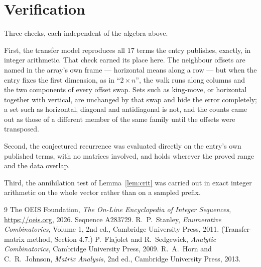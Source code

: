 \documentclass[11pt,a4paper]{article}
\theoremstyle{plain}
\theoremstyle{definition}
\begin{document}
\section{Verification}

Three checks, each independent of the algebra above.

First, the transfer model reproduces all $17$ terms the entry publishes, exactly, in
integer arithmetic. That check earned its place here. The neighbour offsets are named in the
array's own frame --- horizontal means along a row --- but when the entry fixes the first
dimension, as in ``$2\times n$'', the walk runs along columns and the two components of every
offset swap. Sets such as king-move, or horizontal together with vertical, are unchanged by
that swap and hide the error completely; a set such as horizontal, diagonal and antidiagonal
is not, and the counts came out as those of a different member of the same family until the
offsets were transposed.

Second, the conjectured recurrence was evaluated directly on the entry's own published terms,
with no matrices involved, and holds wherever the proved range and the data overlap.

Third, the annihilation test of Lemma~\ref{lem:crit} was carried out in exact integer
arithmetic on the whole vector rather than on a sampled prefix.

\begin{thebibliography}{9}
 The OEIS Foundation, \emph{The On-Line Encyclopedia of Integer
Sequences}, \url{https://oeis.org}, 2026. Sequence A283729.
 R.~P.~Stanley, \emph{Enumerative Combinatorics}, Volume 1, 2nd ed.,
Cambridge University Press, 2011. (Transfer-matrix method, Section 4.7.)
 P.~Flajolet and R.~Sedgewick, \emph{Analytic Combinatorics}, Cambridge
University Press, 2009.
 R.~A.~Horn and C.~R.~Johnson, \emph{Matrix Analysis}, 2nd ed., Cambridge
University Press, 2013.
\end{thebibliography}
\end{document}
